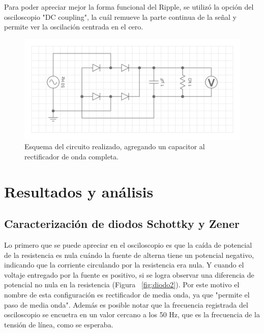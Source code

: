 \documentclass[twoside,twocolumn,a4paper]{article}
\begin{document}
Para poder apreciar mejor la forma funcional del Ripple, se utiliz\'o la opci\'on del osciloscopio "DC coupling", la cu\'al remueve la parte continua de la se\~nal y permite ver la oscilaci\'on centrada en el cero. 

\begin{figure}[H]
\includegraphics[width=\linewidth]{disp_exp3.png}
\captionsetup{justification=centering}
\caption{Esquema del circuito realizado, agregando un capacitor al rectificador de onda completa.}
\label{fig:disp_exp3}
\end{figure}


\section{Resultados y an\'alisis}

\subsection{Caracterizaci\'on de diodos Schottky y Zener}

Lo primero que se puede apreciar en el osciloscopio es que la ca\'ida de potencial de la resistencia es nula cu\'ando la fuente de alterna tiene un potencial negativo, indicando que la corriente circulando por la resistencia era nula. Y cuando el voltaje entregado por la fuente es positivo, si se logra observar una diferencia de potencial no nula en la resistencia (Figura ~\ref{fig:diodo2}). Por este motivo el nombre de esta configuraci\'on es rectificador de media onda, ya que "permite el paso de media onda". Adem\'as es posible notar que la frecuencia registrada del osciloscopio se encuetra en un valor cercano a los 50 Hz, que es la frecuencia de la tensi\'on de l\'inea, como se esperaba.
\end{document}
